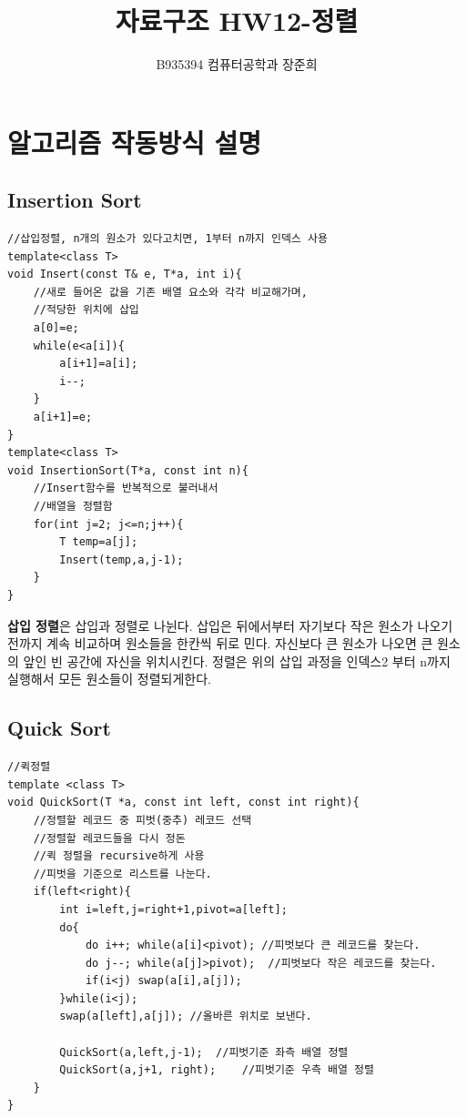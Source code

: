 \documentclass[a4paper,11pt]{article}
\begin{document}
\title{자료구조 HW12-정렬}
\author{B935394 컴퓨터공학과 장준희}
\maketitle
\newpage
\section{알고리즘 작동방식 설명}

\subsection{Insertion Sort}
\begin{Verbatim}
//삽입정렬, n개의 원소가 있다고치면, 1부터 n까지 인덱스 사용
template<class T>
void Insert(const T& e, T*a, int i){
    //새로 들어온 값을 기존 배열 요소와 각각 비교해가며,
    //적당한 위치에 삽입
    a[0]=e;
    while(e<a[i]){
        a[i+1]=a[i];
        i--;
    }
    a[i+1]=e;
}
template<class T>
void InsertionSort(T*a, const int n){
    //Insert함수를 반복적으로 불러내서
    //배열을 정렬함
    for(int j=2; j<=n;j++){
        T temp=a[j];
        Insert(temp,a,j-1);
    }
}
\end{Verbatim}

\textbf{삽입 정렬}은 삽입과 정렬로 나뉜다. 삽입은 뒤에서부터 자기보다 작은 원소가 나오기 전까지 계속 비교하며 원소들을 한칸씩 뒤로 민다. 자신보다 큰 원소가 나오면 큰 원소의 앞인 빈 공간에 자신을 위치시킨다. 정렬은 위의 삽입 과정을 인덱스2 부터 n까지 실행해서 모든 원소들이 정렬되게한다.
\subsection{Quick Sort}
\begin{Verbatim}
//퀵정렬
template <class T>
void QuickSort(T *a, const int left, const int right){
    //정렬할 레코드 중 피벗(중추) 레코드 선택
    //정렬할 레코드들을 다시 정돈
    //퀵 정렬을 recursive하게 사용
    //피벗을 기준으로 리스트를 나눈다.
    if(left<right){
        int i=left,j=right+1,pivot=a[left];
        do{
            do i++; while(a[i]<pivot); //피벗보다 큰 레코드를 찾는다.
            do j--; while(a[j]>pivot);	//피벗보다 작은 레코드를 찾는다.
            if(i<j) swap(a[i],a[j]);
        }while(i<j);	
        swap(a[left],a[j]);	//올바른 위치로 보낸다.

        QuickSort(a,left,j-1);  //피벗기준 좌측 배열 정렬
        QuickSort(a,j+1, right);    //피벗기준 우측 배열 정렬
    }
}
\end{Verbatim}
\end{document}
